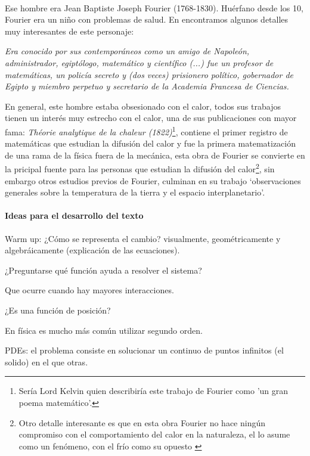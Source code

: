 \documentclass{article}
\begin{document}
\paragraph{}Ese hombre era Jean Baptiste Joseph Fourier (1768-1830). Huérfano desde los 10, Fourier era un niño con problemas de salud. En \cite{Fleming1999} encontramos algunos detalles muy interesantes de este personaje:
\begin{center}
    \textit{Era conocido por sus contemporáneos como un amigo de Napoleón, administrador, egiptólogo, matemático y científico (...) fue un profesor de matemáticas, un policía secreto y (dos veces) prisionero político, gobernador de Egipto y miembro perpetuo y secretario de la Academia Francesa de Ciencias.}
\end{center}
En general, este hombre estaba obsesionado con el calor, todos sus trabajos tienen un interés muy estrecho con el calor, una de sus publicaciones con mayor fama: \textit{ Théorie analytique de la chaleur (1822)}\footnote{Sería Lord Kelvin quien describiría este trabajo de Fourier como 'un gran poema matemático'\cite{Fleming1999}.}, contiene el primer registro de matemáticas que estudian la difusión del calor y fue la primera matematización de una rama de la física fuera de la mecánica, esta obra de Fourier se convierte en la pricipal fuente para las personas que estudian la difusión del calor\footnote{Otro detalle interesante es que en esta obra Fourier no hace ningún compromiso con el comportamiento del calor en la naturaleza, el lo asume como un fenómeno, con el frío como su opuesto \cite{GrattanGuinness2005}}, sin embargo otros estudios previos de Fourier, culminan en su trabajo ‘observaciones generales sobre la temperatura de la tierra y el espacio interplanetario’.
\paragraph{Ideas para el desarrollo del texto}
Warm up: ¿Cómo se representa el cambio? visualmente, geométricamente y algebráicamente (explicación de las ecuaciones).

¿Preguntarse qué función ayuda a resolver el sistema?

Que ocurre cuando hay mayores interacciones.

¿Es una función de posición?

En física es mucho más común utilizar segundo orden.

PDEs: el problema consiste en solucionar un continuo de puntos infinitos (el solido) en el que otras.
\end{document}
